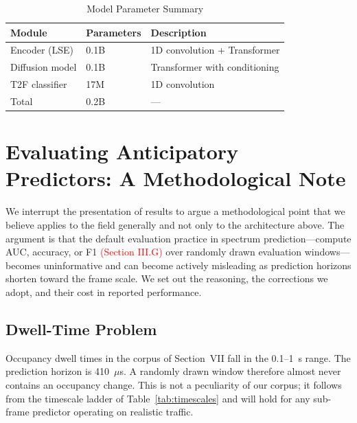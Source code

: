 \documentclass[lettersize,journal]{IEEEtran}
\newcommand{\red}[1]{\textcolor{red}{#1}}
\newcommand{\us}{\ensuremath{\mu}s}
\begin{document}
\begin{table}[!t]
\centering
\caption{Model Parameter Summary}
\label{tab:params}
\renewcommand{\arraystretch}{1.2}
\begin{tabular}{@{}lll@{}}
\toprule
\textbf{Module} & \textbf{Parameters} & \textbf{Description} \\
\midrule
Encoder (LSE)   & 0.1B & 1D convolution + Transformer \\
Diffusion model & 0.1B & Transformer with conditioning \\
T2F classifier  & 17M  & 1D convolution \\
\midrule
Total           & 0.2B & --- \\
\bottomrule
\end{tabular}
\end{table}

\section{\textbf{Evaluating Anticipatory Predictors: A Methodological Note}}

We interrupt the presentation of results to argue a methodological point
that we believe applies to the field generally and not only to the
architecture above. The argument is that the default evaluation practice
in spectrum prediction---compute AUC, accuracy, or F1 \red{(Section III.G)} over randomly drawn
evaluation windows---becomes uninformative and can become actively
misleading as prediction horizons shorten toward the frame scale. We set
out the reasoning, the corrections we adopt, and their cost in reported
performance.

\subsection{\textbf{Dwell-Time Problem}}
Occupancy dwell times in the corpus of Section~VII fall in the 0.1--1~s
range. The prediction horizon is 410~\us. A randomly drawn window
therefore almost never contains an occupancy change. This is not a
peculiarity of our corpus; it follows from the timescale ladder of
Table~\ref{tab:timescales} and will hold for any sub-frame predictor
operating on realistic traffic.
\end{document}
